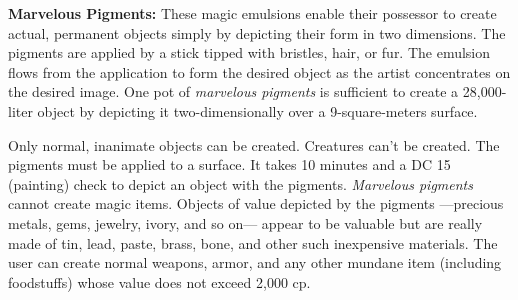 







\textbf{Marvelous Pigments:} These magic emulsions enable their possessor to create actual, permanent objects simply by depicting their form in two dimensions. The pigments are applied by a stick tipped with bristles, hair, or fur. The emulsion flows from the application to form the desired object as the artist concentrates on the desired image. One pot of \emph{marvelous pigments} is sufficient to create a 28,000-liter object by depicting it two-dimensionally over a 9-square-meters surface.

Only normal, inanimate objects can be created. Creatures can't be created. The pigments must be applied to a surface. It takes 10 minutes and a DC 15  (painting) check to depict an object with the pigments. \emph{Marvelous pigments} cannot create magic items. Objects of value depicted by the pigments ---precious metals, gems, jewelry, ivory, and so on--- appear to be valuable but are really made of tin, lead, paste, brass, bone, and other such inexpensive materials. The user can create normal weapons, armor, and any other mundane item (including foodstuffs) whose value does not exceed 2,000 cp.

